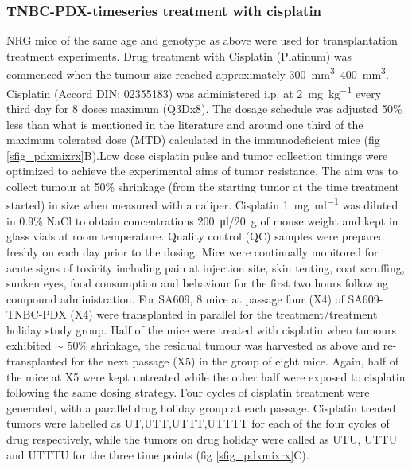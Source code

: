 \documentclass{article}
\begin{document}
\subsubsection{TNBC-PDX-timeseries treatment with cisplatin}
\label{ssec:rx}
NRG mice of the same age and genotype as above were used for transplantation treatment experiments. Drug treatment with Cisplatin (Platinum) was commenced when the tumour size reached approximately \SIrange{300}{400}{\mm\cubed}. Cisplatin (Accord DIN: 02355183)  was administered i.p. at \SI{2}{\mg\per\kg} every third day for 8 doses maximum (Q3Dx8). The dosage schedule was adjusted 50\% less than what is mentioned in the literature \cite{li2013enhanced,wang2013klotho} and around one third of the maximum tolerated dose (MTD) calculated in the immunodeficient mice (fig \ref{sfig_pdxmixrx}B).Low dose cisplatin pulse and tumor collection timings were optimized to achieve the experimental aims of tumor resistance. The aim was to collect tumour at 50\% shrinkage (from the starting tumor at the time treatment started) in size when measured with a caliper. Cisplatin \SI{1}{\mg\per\ml} was diluted in 0.9\% NaCl to obtain concentrations \SI{200}{\ul}/\SI{20}{\g} of mouse weight and kept in glass vials at room temperature. Quality control (QC) samples were prepared freshly on each day prior to the dosing. Mice were continually monitored for acute signs of toxicity including pain at injection site, skin tenting, coat scruffing, sunken eyes, food consumption and behaviour for the first two hours following compound administration. For SA609, 8 mice at passage four (X4) of SA609-TNBC-PDX (X4) were transplanted in parallel for the treatment/treatment holiday study group. Half of the mice were treated with cisplatin when tumours exhibited $\sim$ 50\% shrinkage, the residual tumour was harvested as above and re-transplanted for the next passage (X5) in the group of eight mice. Again, half of the mice at X5 were kept untreated while the other half were exposed to cisplatin following the same dosing strategy. Four cycles of cisplatin treatment were generated, with a parallel drug holiday group at each passage. Cisplatin treated tumors were labelled as UT,UTT,UTTT,UTTTT for each of the four cycles of drug respectively, while the tumors on drug holiday were called as UTU, UTTU and UTTTU for the three time points (fig \ref{sfig_pdxmixrx}C).

 
\end{document}

